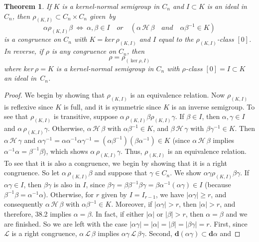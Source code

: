 \documentclass{surv-l}
\numberwithin{equation}{section}
\numberwithin{table}{section}
\numberwithin{figure}{section}
\theoremstyle{plain}
\newtheorem{theorem}[equation]{Theorem}
\theoremstyle{definition}
\begin{document}
\begin{theorem}\label{thm8.38.3}
If $K$ is a kernel-normal semigroup in $C_{n}$ and $I \subset K$
is an ideal in $C_{n}$, then $\rho_{(K,I)}\subset C_{n}\times
C_{n}$ given~by
\[
\alpha\rho_{(K,I)}\beta\ \Leftrightarrow\ \alpha,\beta\in I\quad
or\quad (\alpha\,\mathcal{H}\,\beta\quad and\quad \alpha\beta^{-1}\in K)
\]
is a congruence on $C_{n}$ with $K=ker\,\rho_{(K,I)}$ and $I$ equal
to the $\rho_{(K,I)}$-class $[0]$. In reverse, if $\rho$ is any
congruence on $C_{n}$, then
\[
\rho=\rho_{(\ker \rho,I)}
\]
where $ker\,\rho=K$ is a kernel-normal semigroup in $C_{n}$ with
$\rho$-class $[0]=I \subset K$ an ideal in~$C_{n}$.
\end{theorem}

\begin{proof} We begin by showing that $\rho_{(K,I)}$ is an equivalence
relation. Now $\rho_{(K,I)}$ is reflexive since $K$ is full, and
it is symmetric since $K$ is an inverse semigroup. To see that
$\rho_{(K,I)}$ is transitive, suppose
$\alpha\,\rho_{(K,I)}\beta\rho_{(K,I)}\gamma$. If $\beta\in I$, then
$\alpha,\gamma\in I$ and $\alpha\,\rho_{(K,I)}\gamma$. Otherwise,
$\alpha\,\mathcal{H}\,\beta$ with $\alpha\beta^{-1}\in K$, and $\beta\,
\mathcal{H}\,\gamma$ with $\beta\gamma^{-1}\in K$. Then $\alpha\,
\mathcal{H}\,\gamma$ and
$\alpha\gamma^{-1}=\alpha\alpha^{-1}\alpha\gamma^{-1}=(\alpha\beta^{-1})(\beta\alpha^{-1})\in
K$ (since $\alpha\,\mathcal{H}\,\beta$ implies
$\alpha^{-1}\alpha=\beta^{-1}\beta$), which shows
$\alpha\,\rho_{(K,I)}\gamma$. Thus, $\rho_{(K,I)}$ is an equivalence
relation. To see that it is also a congruence, we begin by showing
that it is a right congruence. So let $\alpha\,\rho_{(K,I)}\beta$
and suppose that $\gamma\in C_{n}$. We show
$\alpha\gamma\rho_{(K,I)}\beta\gamma$. If $\alpha\gamma\in I$,
then $\beta\gamma$ is also in $I$, since
$\beta\gamma=\beta\beta^{-1}\beta\gamma=\beta\alpha^{-1}(\alpha\gamma)\in
I$ (because $\beta^{-1}\beta=\alpha^{-1}\alpha$). Otherwise, for
$r$ given by $I=I_{r-1}$, we have $|\alpha\gamma|\geq r$, and
consequently $\alpha\,\mathcal{H}\,\beta$ with $\alpha\beta^{-1}\in
K$. Moreover, if $|\alpha\gamma|>r$, then $|\alpha|>r$, and
therefore, 38.2 implies $\alpha=\beta$. In fact, if either
$|\alpha|$ or $|\beta|>r$, then $\alpha=\beta$ and we are
finished. So we are left with the case
$|\alpha\gamma|=|\alpha|=|\beta|=|\beta\gamma|=r$. First, since
$\mathcal{L}$ is a right congruence, $\alpha\,\mathcal{L}\,\beta$
implies $\alpha\gamma\,\mathcal{L}\,\beta\gamma$. Second,
$\mathbf{d}(\alpha\gamma)\subset \mathbf{d}\alpha$ and

\end{proof}
\end{document}
